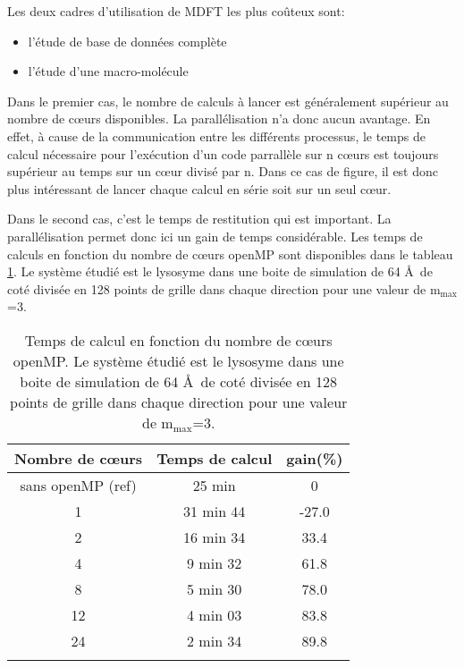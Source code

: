 Les deux cadres d'utilisation de MDFT les plus coûteux sont:
\begin{itemize}
\item l'étude de base de données complète
\item l'étude d'une macro-molécule
\end{itemize}

Dans le premier cas, le nombre de calculs à lancer est généralement supérieur au nombre de cœurs disponibles. La parallélisation n'a donc aucun avantage. En effet, à cause de la communication entre les différents processus, le temps de calcul nécessaire pour l’exécution d'un code parrallèle sur n cœurs est toujours supérieur au temps sur un cœur divisé par n. Dans ce cas de figure, il est donc plus intéressant de lancer chaque calcul en série soit sur un seul cœur.

Dans le second cas, c'est le temps de restitution qui est important. La parallélisation permet donc ici un gain de temps considérable. Les temps de calculs en fonction du nombre de cœurs openMP sont disponibles dans le tableau \ref{tab:perf_minimiseurs}. Le système étudié est le lysosyme dans une boite de simulation de 64 \AA\ de coté divisée en 128 points de grille dans chaque direction pour une valeur de $\mathrm{m}_\mathrm{max}$=3.



\begin{table}[H]
 \centering
  \begin{tabular}{ c | c | c }
      Nombre de cœurs & Temps de calcul & gain(\%)\\
    \hline
    sans openMP (ref) & 25 min & 0\\
     1 & 31 min 44 & -27.0 \\
     2 & 16 min 34 &  33.4 \\
     4 &  9 min 32 &  61.8 \\
     8 &  5 min 30 &  78.0 \\
    12 &  4 min 03 &  83.8 \\
    24 &  2 min 34 &  89.8 \\
    \hline \multicolumn{3}{c}{} \\[-1em]\hline
  \end{tabular}
  \caption{Temps de calcul en fonction du nombre de cœurs openMP. Le système étudié est le lysosyme dans une boite de simulation de 64 \AA\ de coté divisée en 128 points de grille dans chaque direction pour une valeur de $\mathrm{m}_\mathrm{max}$=3.}
  \label{tab:perf_minimiseurs}  
\end{table}


